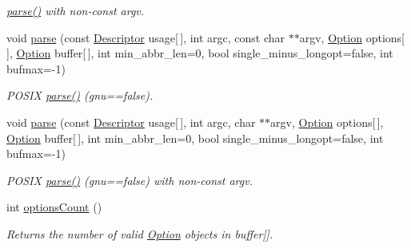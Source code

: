 \begin{DoxyCompactItemize}
\begin{DoxyCompactList}\small\item\em \hyperlink{classoption_1_1_parser_a6e0b5778d1cfbd6cd51240e74d01e138}{parse()} with non-\/const argv. \end{DoxyCompactList}\item 
\mbox{\label{classoption_1_1_parser_a41885a7308249c8532714e15b36106bd}} 
void \hyperlink{classoption_1_1_parser_a41885a7308249c8532714e15b36106bd}{parse} (const \hyperlink{structoption_1_1_descriptor}{Descriptor} usage\mbox{[}$\,$\mbox{]}, int argc, const char $\ast$$\ast$argv, \hyperlink{classoption_1_1_option}{Option} options\mbox{[}$\,$\mbox{]}, \hyperlink{classoption_1_1_option}{Option} buffer\mbox{[}$\,$\mbox{]}, int min\+\_\+abbr\+\_\+len=0, bool single\+\_\+minus\+\_\+longopt=false, int bufmax=-\/1)
\begin{DoxyCompactList}\small\item\em P\+O\+S\+IX \hyperlink{classoption_1_1_parser_a6e0b5778d1cfbd6cd51240e74d01e138}{parse()} (gnu==false). \end{DoxyCompactList}\item 
\mbox{\label{classoption_1_1_parser_ad40585faa23a97a186cf9a45b8c2b42b}} 
void \hyperlink{classoption_1_1_parser_ad40585faa23a97a186cf9a45b8c2b42b}{parse} (const \hyperlink{structoption_1_1_descriptor}{Descriptor} usage\mbox{[}$\,$\mbox{]}, int argc, char $\ast$$\ast$argv, \hyperlink{classoption_1_1_option}{Option} options\mbox{[}$\,$\mbox{]}, \hyperlink{classoption_1_1_option}{Option} buffer\mbox{[}$\,$\mbox{]}, int min\+\_\+abbr\+\_\+len=0, bool single\+\_\+minus\+\_\+longopt=false, int bufmax=-\/1)
\begin{DoxyCompactList}\small\item\em P\+O\+S\+IX \hyperlink{classoption_1_1_parser_a6e0b5778d1cfbd6cd51240e74d01e138}{parse()} (gnu==false) with non-\/const argv. \end{DoxyCompactList}\item 
int \hyperlink{classoption_1_1_parser_aee62badd2a19a5b88cbc4a9b11813b82}{options\+Count} ()
\begin{DoxyCompactList}\small\item\em Returns the number of valid \hyperlink{classoption_1_1_option}{Option} objects in {\ttfamily buffer}\mbox{[}\mbox{]}. \end{DoxyCompactList}\item 

\end{DoxyCompactItemize}
